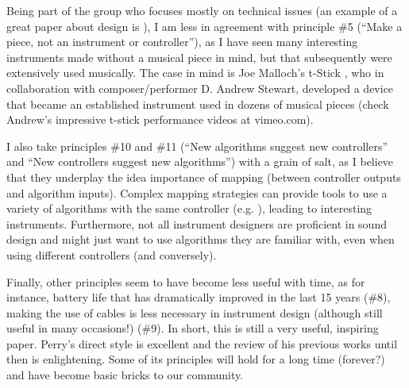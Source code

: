 Being part of the group who focuses mostly on technical issues (an example of a great paper about design is \cite{Bongers:2000}), I am less in agreement with principle \#5 (``Make a piece, not an instrument or controller''), as I have seen many interesting instruments made without a musical piece in mind, but that subsequently were extensively used musically. The case in mind is Joe Malloch's t-Stick \cite{Malloch:2007}, who in collaboration with composer/performer D. Andrew Stewart, developed a device that became an established instrument used in dozens of musical pieces (check Andrew's impressive t-stick performance videos at vimeo.com). 

I also take principles \#10 and \#11 (``New algorithms suggest new controllers'' and ``New controllers suggest new algorithms'') with a grain of salt, as I believe that they underplay the idea importance of mapping (between controller outputs and algorithm inputs). Complex mapping strategies can provide tools to use a variety of algorithms with the same controller (e.g. \cite{Hunt:2002}), leading to interesting instruments. Furthermore, not all instrument designers are proficient in sound design and might just want to use algorithms they are familiar with, even when using different controllers (and conversely).

Finally, other principles seem to have become less useful with time, as for instance, battery life that has dramatically improved in the last 15 years (\#8), making the use of cables is less necessary in instrument design (although still useful in many occasions!) (\#9). In short, this is still a very useful, inspiring paper. Perry's direct style is excellent and the review of his previous works until then is enlightening. Some of its principles will hold for a long time (forever?) and have become basic bricks to our community. 

